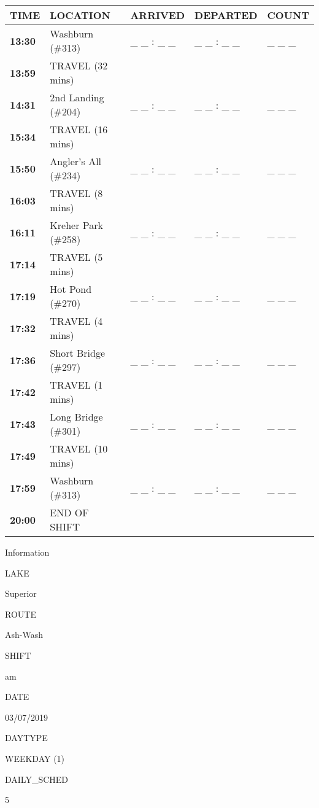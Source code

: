 \documentclass[]{article}
\begin{document}
\begin{tabular}{>{\bfseries}lllll}
\toprule
\textbf{TIME} & \textbf{LOCATION} & \textbf{ARRIVED} & \textbf{DEPARTED} & \textbf{COUNT}\\
\midrule
13:30 & Washburn (\#313) & \_ \_ : \_ \_ & \_ \_ : \_ \_ & \_ \_ \_\\
13:59 & TRAVEL (32 mins) &  &  & \\
14:31 & 2nd Landing (\#204) & \_ \_ : \_ \_ & \_ \_ : \_ \_ & \_ \_ \_\\
15:34 & TRAVEL (16 mins) &  &  & \\
15:50 & Angler's All (\#234) & \_ \_ : \_ \_ & \_ \_ : \_ \_ & \_ \_ \_\\
16:03 & TRAVEL (8 mins) &  &  & \\
16:11 & Kreher Park (\#258) & \_ \_ : \_ \_ & \_ \_ : \_ \_ & \_ \_ \_\\
17:14 & TRAVEL (5 mins) &  &  & \\
17:19 & Hot Pond (\#270) & \_ \_ : \_ \_ & \_ \_ : \_ \_ & \_ \_ \_\\
17:32 & TRAVEL (4 mins) &  &  & \\
17:36 & Short Bridge (\#297) & \_ \_ : \_ \_ & \_ \_ : \_ \_ & \_ \_ \_\\
17:42 & TRAVEL (1 mins) &  &  & \\
17:43 & Long Bridge (\#301) & \_ \_ : \_ \_ & \_ \_ : \_ \_ & \_ \_ \_\\
17:49 & TRAVEL (10 mins) &  &  & \\
17:59 & Washburn (\#313) & \_ \_ : \_ \_ & \_ \_ : \_ \_ & \_ \_ \_\\
20:00 & END OF SHIFT &  &  & \\
\bottomrule
\end{tabular}\newpage

Information

LAKE

Superior

ROUTE

Ash-Wash

SHIFT

am

DATE

03/07/2019

DAYTYPE

WEEKDAY (1)

DAILY\_SCHED

5

\vspace{24pt}
\end{document}
